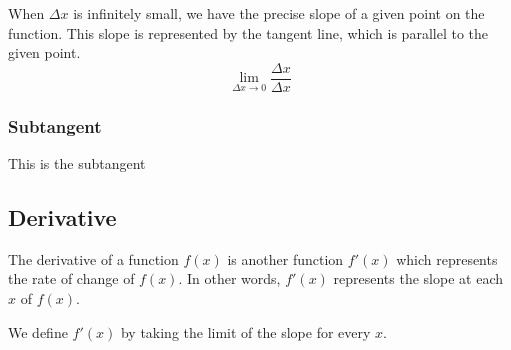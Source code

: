 \documentclass[a4paper]{article}
\begin{document}
\begin{minipage}{0.5\textwidth}
    When \(\Delta x\) is infinitely small, we have the precise slope of a given point
    on the function. This slope is represented by the tangent line, which is parallel to the given point.
    \[
        \lim_{\Delta x \to 0} \frac{\Delta x}{\Delta x}
    \]
\end{minipage}
\begin{minipage}{0.5\textwidth}
\end{minipage}

\subsubsection{Subtangent}

This is the subtangent

\subsection{Derivative}

The derivative of a function \(f(x)\) is another function \(f'(x)\) which
represents the rate of change of \(f(x)\). In other words, \(f'(x)\)
represents the slope at each \(x\) of \(f(x)\).

We define \(f'(x)\) by taking the limit of the slope for every \(x\).
\end{document}
